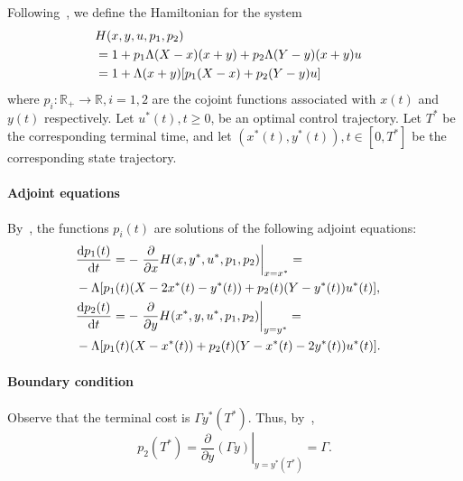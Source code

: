 \documentclass[10pt,journal,letterpaper]{IEEEtran}
\begin{document}
\begin{IEEEproof}
Following~\cite[Section~3.3.1]{stochctrl.bertsekas05dpoc-vol1}, we define the Hamiltonian for the system
\begin{align}
\lefteqn{H(x,y,u,p_1,p_2)} \nonumber \\
 &= 1 + p_1\Lambda(X-x)(x+y) + p_2 \Lambda(Y-y)(x+y)u \nonumber \\
 &= 1 + \Lambda(x+y)[p_1(X-x) + p_2(Y-y)u] \label{eqn:hamiltonian}
\end{align}
where $p_i:\mathbb{R}_+ \rightarrow \mathbb{R}, i = 1,2$ are the cojoint functions
associated with $x(t)$ and $y(t)$ respectively.
Let $u^{\ast}(t), t \geq 0$, be an optimal control trajectory.
Let $T^{\ast}$ be the corresponding terminal time, and let $(x^{\ast}(t),y^{\ast}(t)), t \in [0,T^{\ast}]$
be the  corresponding state trajectory.
\paragraph{Adjoint equations}
By~\cite[Section~3.3.1, Proposition~3.1]{stochctrl.bertsekas05dpoc-vol1},
the functions $p_i(t)$ are
solutions of the following adjoint equations:
\begin{align}
\lefteqn{\frac{{\rm d}p_1(t)}{{\rm d}t}=-\left.\frac{\partial}{\partial x}H(x,y^{\ast},u^{\ast},p_1,p_2)\right|_{x = x^{\ast}}=}\nonumber\\
 &-\Lambda[p_1(t)(X-2x^{\ast}(t) - y^{\ast}(t)) + p_2(t)(Y-y^{\ast}(t))u^{\ast}(t)], \label{adjoint1} \\
\lefteqn{\frac{{\rm d}p_2(t)}{{\rm d}t}=-\left.\frac{\partial}{\partial y}H(x^{\ast},y,u^{\ast},p_1,p_2)\right|_{y = y^{\ast}}=}\nonumber\\
 &-\Lambda[p_1(t)(X-x^{\ast}(t)) + p_2(t)(Y - x^{\ast}(t) -2 y^{\ast}(t))u^{\ast}(t)]. \label{adjoint2}
\end{align}
\paragraph{Boundary condition} 
Observe that the terminal cost is $\Gamma y^{\ast}(T^{\ast})$.
Thus, by~\cite[Section~3.3.1, Proposition~3.1]{stochctrl.bertsekas05dpoc-vol1},
\begin{equation}
p_2(T^{\ast}) = \left. \frac{\partial}{\partial y} \left(\Gamma
y\right) \right|_{y = y^{\ast}(T^{\ast})} = \Gamma.
\label{adjoint-bdary-cond1}
\end{equation}

\end{IEEEproof}
\end{document}
